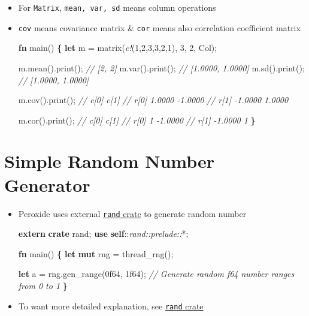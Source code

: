 \documentclass[]{book}
\newenvironment{Shaded}{\begin{snugshade}}{\end{snugshade}}
\newcommand{\CommentTok}[1]{\textcolor[rgb]{0.56,0.35,0.01}{\textit{#1}}}
\newcommand{\DecValTok}[1]{\textcolor[rgb]{0.00,0.00,0.81}{#1}}
\newcommand{\KeywordTok}[1]{\textcolor[rgb]{0.13,0.29,0.53}{\textbf{#1}}}
\newcommand{\NormalTok}[1]{#1}
\newcommand{\OperatorTok}[1]{\textcolor[rgb]{0.81,0.36,0.00}{\textbf{#1}}}
\newcommand{\PreprocessorTok}[1]{\textcolor[rgb]{0.56,0.35,0.01}{\textit{#1}}}
\begin{document}
\begin{itemize}
\item
  For \texttt{Matrix}, \texttt{mean,\ var,\ sd} means column operations
\item
  \texttt{cov} means covariance matrix \& \texttt{cor} means also correlation coefficient matrix

\begin{Shaded}
\begin{Highlighting}[]
\KeywordTok{fn}\NormalTok{ main() }\OperatorTok{\{}
    \KeywordTok{let}\NormalTok{ m = matrix(}\PreprocessorTok{c!}\NormalTok{(}\DecValTok{1}\NormalTok{,}\DecValTok{2}\NormalTok{,}\DecValTok{3}\NormalTok{,}\DecValTok{3}\NormalTok{,}\DecValTok{2}\NormalTok{,}\DecValTok{1}\NormalTok{), }\DecValTok{3}\NormalTok{, }\DecValTok{2}\NormalTok{, Col);}

\NormalTok{    m.mean().print(); }\CommentTok{// [2, 2]}
\NormalTok{    m.var().print();  }\CommentTok{// [1.0000, 1.0000]}
\NormalTok{    m.sd().print();   }\CommentTok{// [1.0000, 1.0000]}

\NormalTok{    m.cov().print();}
    \CommentTok{//         c[0]    c[1]}
    \CommentTok{// r[0]  1.0000 -1.0000}
    \CommentTok{// r[1] -1.0000  1.0000}

\NormalTok{    m.cor().print();}
    \CommentTok{//         c[0]    c[1]}
    \CommentTok{// r[0]       1 -1.0000}
    \CommentTok{// r[1] -1.0000       1}
\OperatorTok{\}}
\end{Highlighting}
\end{Shaded}
\end{itemize}

\hypertarget{simple-random-number-generator}{%
\section{Simple Random Number Generator}\label{simple-random-number-generator}}

\begin{itemize}
\item
  Peroxide uses external \href{https://crates.io/crates/rand}{\texttt{rand} crate} to generate random number

\begin{Shaded}
\begin{Highlighting}[]
\KeywordTok{extern} \KeywordTok{crate}\NormalTok{ rand;}
\KeywordTok{use} \KeywordTok{self}\NormalTok{::}\PreprocessorTok{rand::prelude::}\NormalTok{*;}

\KeywordTok{fn}\NormalTok{ main() }\OperatorTok{\{}
    \KeywordTok{let} \KeywordTok{mut}\NormalTok{ rng = thread_rng();}

    \KeywordTok{let}\NormalTok{ a = rng.gen_range(}\DecValTok{0f64}\NormalTok{, }\DecValTok{1f64}\NormalTok{); }\CommentTok{// Generate random f64 number ranges from 0 to 1}
\OperatorTok{\}}
\end{Highlighting}
\end{Shaded}
\item
  To want more detailed explanation, see \href{https://crates.io/crates/rand}{\texttt{rand} crate}
\end{itemize}
\end{document}
